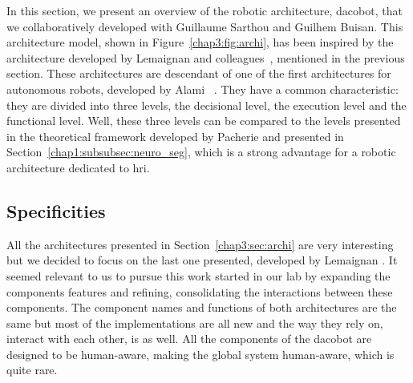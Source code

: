\documentclass[a4paper,11pt,twoside]{StyleThese}
\begin{document}
In this section, we present an overview of the robotic architecture, \acrfull{dacobot}, that we collaboratively developed with Guillaume Sarthou and Guilhem Buisan. This architecture model, shown in Figure~\ref{chap3:fig:archi}, has been inspired by the architecture developed by Lemaignan and colleagues~\cite{lemaignan_2017_artificial}, mentioned in the previous section. These architectures are descendant of one of the first architectures for autonomous robots, developed by Alami \etal{}~\cite{alami_1998_architecture}. They have a common characteristic: they are divided into three levels, the decisional level, the execution level and the functional level. Well, these three levels can be compared to the levels presented in the theoretical framework developed by Pacherie and presented in Section~\ref{chap1:subsubsec:neuro_seg}, which is a strong advantage for a robotic architecture dedicated to \acrshort{hri}.

\subsection{Specificities}

All the architectures presented in Section~\ref{chap3:sec:archi} are very interesting but we decided to focus on the last one presented, developed by Lemaignan \etal{}. It seemed relevant to us to pursue this work started in our lab by expanding the components features and refining, consolidating the interactions between these components. The component names and functions of both architectures are the same but most of the implementations are all new and the way they rely on, interact with each other, is as well. All the components of the \acrshort{dacobot} are designed to be human-aware, making the global system human-aware, which is quite rare.
\end{document}
